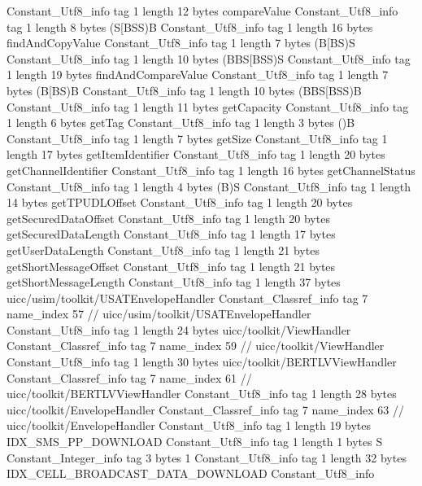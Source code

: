 {{{		}
		Constant_Utf8_info {
			tag	1
			length	12
			bytes	compareValue
		}
		Constant_Utf8_info {
			tag	1
			length	8
			bytes	(S[BSS)B
		}
		Constant_Utf8_info {
			tag	1
			length	16
			bytes	findAndCopyValue
		}
		Constant_Utf8_info {
			tag	1
			length	7
			bytes	(B[BS)S
		}
		Constant_Utf8_info {
			tag	1
			length	10
			bytes	(BBS[BSS)S
		}
		Constant_Utf8_info {
			tag	1
			length	19
			bytes	findAndCompareValue
		}
		Constant_Utf8_info {
			tag	1
			length	7
			bytes	(B[BS)B
		}
		Constant_Utf8_info {
			tag	1
			length	10
			bytes	(BBS[BSS)B
		}
		Constant_Utf8_info {
			tag	1
			length	11
			bytes	getCapacity
		}
		Constant_Utf8_info {
			tag	1
			length	6
			bytes	getTag
		}
		Constant_Utf8_info {
			tag	1
			length	3
			bytes	()B
		}
		Constant_Utf8_info {
			tag	1
			length	7
			bytes	getSize
		}
		Constant_Utf8_info {
			tag	1
			length	17
			bytes	getItemIdentifier
		}
		Constant_Utf8_info {
			tag	1
			length	20
			bytes	getChannelIdentifier
		}
		Constant_Utf8_info {
			tag	1
			length	16
			bytes	getChannelStatus
		}
		Constant_Utf8_info {
			tag	1
			length	4
			bytes	(B)S
		}
		Constant_Utf8_info {
			tag	1
			length	14
			bytes	getTPUDLOffset
		}
		Constant_Utf8_info {
			tag	1
			length	20
			bytes	getSecuredDataOffset
		}
		Constant_Utf8_info {
			tag	1
			length	20
			bytes	getSecuredDataLength
		}
		Constant_Utf8_info {
			tag	1
			length	17
			bytes	getUserDataLength
		}
		Constant_Utf8_info {
			tag	1
			length	21
			bytes	getShortMessageOffset
		}
		Constant_Utf8_info {
			tag	1
			length	21
			bytes	getShortMessageLength
		}
		Constant_Utf8_info {
			tag	1
			length	37
			bytes	uicc/usim/toolkit/USATEnvelopeHandler
		}
		Constant_Classref_info {
			tag	7
			name_index	57		// uicc/usim/toolkit/USATEnvelopeHandler
		}
		Constant_Utf8_info {
			tag	1
			length	24
			bytes	uicc/toolkit/ViewHandler
		}
		Constant_Classref_info {
			tag	7
			name_index	59		// uicc/toolkit/ViewHandler
		}
		Constant_Utf8_info {
			tag	1
			length	30
			bytes	uicc/toolkit/BERTLVViewHandler
		}
		Constant_Classref_info {
			tag	7
			name_index	61		// uicc/toolkit/BERTLVViewHandler
		}
		Constant_Utf8_info {
			tag	1
			length	28
			bytes	uicc/toolkit/EnvelopeHandler
		}
		Constant_Classref_info {
			tag	7
			name_index	63		// uicc/toolkit/EnvelopeHandler
		}
		Constant_Utf8_info {
			tag	1
			length	19
			bytes	IDX_SMS_PP_DOWNLOAD
		}
		Constant_Utf8_info {
			tag	1
			length	1
			bytes	S
		}
		Constant_Integer_info {
			tag	3
			bytes	1
		}
		Constant_Utf8_info {
			tag	1
			length	32
			bytes	IDX_CELL_BROADCAST_DATA_DOWNLOAD
		}
		Constant_Utf8_info {
}}}
